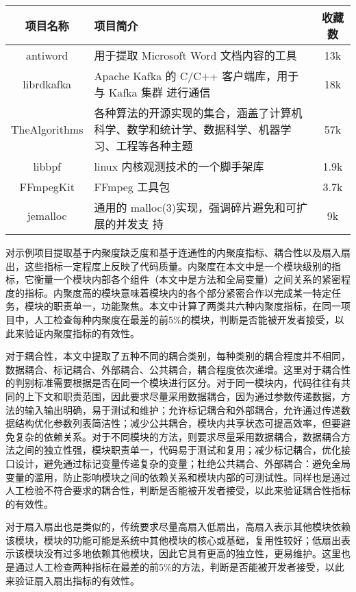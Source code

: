 \begin{table}[htbp]
\vspace{0.5em}\centering\wuhao
\begin{tabular}{cp{10cm}c}
\toprule
项目名称 & 项目简介 & 收藏数 \\
\midrule
antiword & 用于提取 Microsoft Word 文档内容的工具 & 13k\\
librdkafka & Apache Kafka 的 C/C++ 客户端库，用于与 Kafka 集群
进行通信 & 18k \\
TheAlgorithms & 各种算法的开源实现的集合，涵盖了计算机科学、数学和统计学、数据科学、机器学习、工程等各种主题 & 57k \\
libbpf & linux 内核观测技术的一个脚手架库 & 1.9k \\
FFmpegKit & FFmpeg 工具包 & 3.7k \\
jemalloc & 通用的 malloc(3)实现，强调碎片避免和可扩展的并发支
持 & 9k \\
\bottomrule
\end{tabular}
\end{table}

对示例项目提取基于内聚度缺乏度和基于连通性的内聚度指标、耦合性以及扇入扇出，这些指标一定程度上反映了代码质量。内聚度在本文中是一个模块级别的指标，它衡量一个模块内部各个组件（本文中是方法和全局变量）之间关系的紧密程度的指标。内聚度高的模块意味着模块内的各个部分紧密合作以完成某一特定任务，模块的职责单一，功能聚焦。本文中计算了两类共六种内聚度指标，在同一项目中，人工检查每种内聚度在最差的前5\%的模块，判断是否能被开发者接受，以此来验证内聚度指标的有效性。

对于耦合性，本文中提取了五种不同的耦合类别，每种类别的耦合程度并不相同，数据耦合、标记耦合、外部耦合、公共耦合，耦合程度依次递增。这里对于耦合性的判别标准需要根据是否在同一个模块进行区分。对于同一模块内，代码往往有共同的上下文和职责范围，因此要求尽量采用数据耦合，因为通过参数传递数据，方法的输入输出明确，易于测试和维护；允许标记耦合和外部耦合，允许通过传递数据结构优化参数列表简洁性；减少公共耦合，模块内共享状态可提高效率，但要避免复杂的依赖关系。对于不同模块的方法，则要求尽量采用数据耦合，数据耦合方法之间的独立性强，模块职责单一，代码易于测试和复用；减少标记耦合，优化接口设计，避免通过标记变量传递复杂的变量；杜绝公共耦合、外部耦合：避免全局变量的滥用，防止影响模块之间的依赖关系和模块内部的可测试性。同样也是通过人工检验不符合要求的耦合性，判断是否能被开发者接受，以此来验证耦合性指标的有效性。

对于扇入扇出也是类似的，传统要求尽量高扇入低扇出，高扇入表示其他模块依赖该模块，模块的功能可能是系统中其他模块的核心或基础，复用性较好；低扇出表示该模块没有过多地依赖其他模块，因此它具有更高的独立性，更易维护。这里也是通过人工检查两种指标在最差的前5\%的方法，判断是否能被开发者接受，以此来验证扇入扇出指标的有效性。

